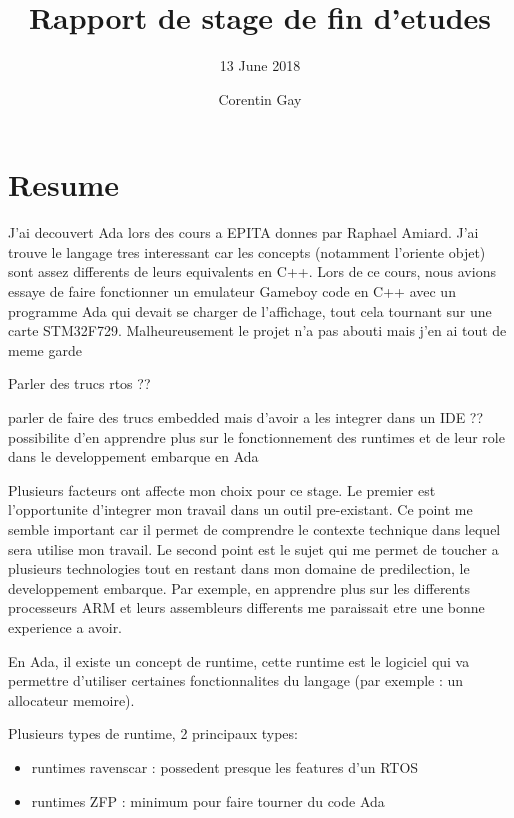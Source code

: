 \documentclass[11pt,]{article}
\title{Rapport de stage de fin d'etudes}
\author{13 June 2018}
\date{Corentin Gay}
\providecommand{\tightlist}{%
  \setlength{\itemsep}{0pt}\setlength{\parskip}{0pt}}
\begin{document}
\maketitle
\thispagestyle{empty}
\clearpage

{
\setcounter{tocdepth}{3}
\tableofcontents
\thispagestyle{empty}
\clearpage
}
\section{Resume}\label{resume}

J'ai decouvert Ada lors des cours a EPITA donnes par Raphael Amiard.
J'ai trouve le langage tres interessant car les concepts (notamment
l'oriente objet) sont assez differents de leurs equivalents en C++. Lors
de ce cours, nous avions essaye de faire fonctionner un emulateur
Gameboy code en C++ avec un programme Ada qui devait se charger de
l'affichage, tout cela tournant sur une carte STM32F729. Malheureusement
le projet n'a pas abouti mais j'en ai tout de meme garde

Parler des trucs rtos ??

parler de faire des trucs embedded mais d'avoir a les integrer dans un
IDE ?? possibilite d'en apprendre plus sur le fonctionnement des
runtimes et de leur role dans le developpement embarque en Ada

Plusieurs facteurs ont affecte mon choix pour ce stage. Le premier est
l'opportunite d'integrer mon travail dans un outil pre-existant. Ce
point me semble important car il permet de comprendre le contexte
technique dans lequel sera utilise mon travail. Le second point est le
sujet qui me permet de toucher a plusieurs technologies tout en restant
dans mon domaine de predilection, le developpement embarque. Par
exemple, en apprendre plus sur les differents processeurs ARM et leurs
assembleurs differents me paraissait etre une bonne experience a avoir.

En Ada, il existe un concept de runtime, cette runtime est le logiciel
qui va permettre d'utiliser certaines fonctionnalites du langage (par
exemple : un allocateur memoire).

Plusieurs types de runtime, 2 principaux types:

\begin{itemize}
\tightlist
\item
  runtimes ravenscar : possedent presque les features d'un RTOS
\item
  runtimes ZFP : minimum pour faire tourner du code Ada
\end{itemize}
\end{document}
